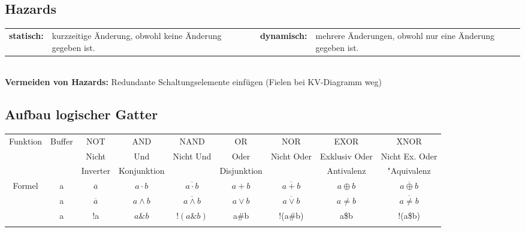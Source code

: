 \subsection{Hazards}
\begin{tabular}{rp{5cm}p{1cm}rp{5cm}}
	\textbf{statisch:}&kurzzeitige Änderung, obwohl keine Änderung gegeben ist.&&
	\textbf{dynamisch:}&mehrere Änderungen, obwohl nur eine Änderung gegeben ist.\\
\end{tabular}\\
\textbf{Vermeiden von Hazards:} Redundante Schaltungselemente einfügen (Fielen bei KV-Diagramm weg)
		


\begin{table}
\subsection{Aufbau logischer Gatter}
\begin{tabular}{|c|c|c|c|c|c|c|c|c|}
\hline
Funktion & Buffer & NOT & AND & NAND & OR & NOR & EXOR & XNOR\\
& & Nicht & Und & Nicht Und & Oder & Nicht Oder & Exklusiv Oder & Nicht Ex. Oder\\
& & Inverter & Konjunktion & & Disjunktion & & Antivalenz & "Aquivalenz \\
\hline
Formel & a & $ \overline a $ & $ a \cdot b $ & $ \overline{a \cdot b} $ & $ a + b $ & $ \overline{a + b} $ & $ a \oplus b $ & $ \overline{a \oplus b} $\\
& a & $ \overline a $ & $ a \wedge b $ & $ \overline{a \wedge b} $ & $ a \vee b $ & $ \overline{a \vee b} $ & $ a \not= b $ & $ \overline{a \not= b} $ \\
& a & !a & $ a \& b $ & $ !(a \& b) $ & a\#b & !(a\#b) & a\$b & !(a\$b) \\
\hline
& & & & & & & &\\

\end{tabular}
\end{table}
